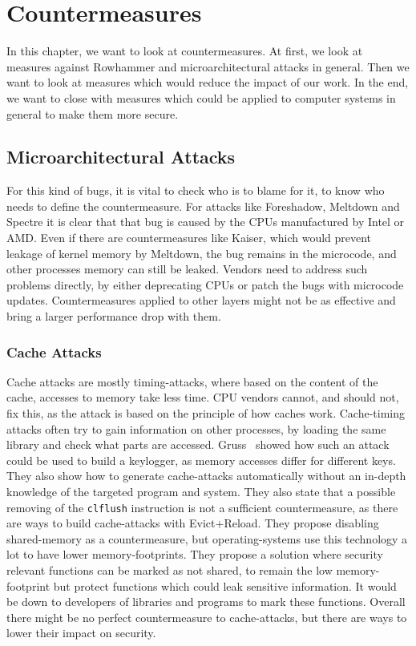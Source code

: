 \chapter{Countermeasures}\label{sec:countermeasure}

In this chapter, we want to look at countermeasures. At first, we look at
measures against Rowhammer and microarchitectural attacks in general. Then we
want to look at measures which would reduce the impact of our work. In the end,
we want to close with measures which could be applied to computer systems in
general to make them more secure.

\section{Microarchitectural Attacks}

For this kind of bugs, it is vital to check who is to blame for it, to know who
needs to define the countermeasure. For attacks like
Foreshadow\cite{foreshadow}, Meltdown\cite{meltdown} and
Spectre\cite{spectre} it is clear that that bug is caused by the CPUs
manufactured by Intel or AMD. Even if there are countermeasures like
Kaiser\cite{kaiserpaper}, which would prevent leakage of kernel memory by
Meltdown, the bug remains in the microcode, and other processes\textquotesingle
memory can still be leaked. Vendors need to address such problems directly, by
either deprecating CPUs or patch the bugs with microcode updates.
Countermeasures applied to other layers might not be as effective and bring a
larger performance drop with them.

\subsection{Cache Attacks}

Cache attacks are mostly timing-attacks, where based on the content of the
cache, accesses to memory take less time. CPU vendors cannot, and should not,
fix this, as the attack is based on the principle of how caches work.
Cache-timing attacks often try to gain information on other processes, by
loading the same library and check what parts are accessed.
Gruss~\etal\cite{gruss2015cache} showed how such an attack could be used to
build a keylogger, as memory accesses differ for different keys. They also show
how to generate cache-attacks automatically without an in-depth knowledge of
the targeted program and system. They also state that a possible removing of
the \texttt{clflush} instruction is not a sufficient countermeasure, as there
are ways to build cache-attacks with Evict+Reload. They propose disabling
shared-memory as a countermeasure, but operating-systems use this technology a
lot to have lower memory-footprints. They propose a solution where security
relevant functions can be marked as not shared, to remain the low
memory-footprint but protect functions which could leak sensitive information.
It would be down to developers of libraries and programs to mark these
functions. Overall there might be no perfect countermeasure to cache-attacks,
but there are ways to lower their impact on security.

